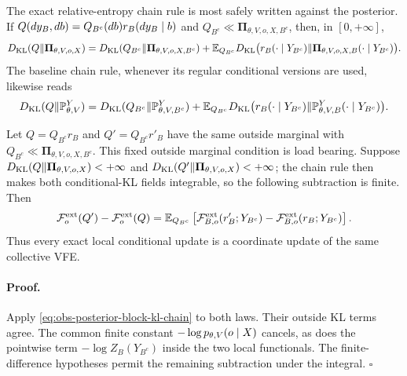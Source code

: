 The exact relative-entropy chain rule is most safely written against the
posterior.  If $Q(dy_B,db)=Q_{B^c}(db)r_B(dy_B\mid b)$ and
\(Q_{B^c}\ll\boldsymbol\Pi_{\theta,V,o,X,B^c}\), then, in \([0,+\infty]\),
\begin{equation}
D_{\mathrm{KL}}(Q\Vert\boldsymbol\Pi_{\theta,V,o,X})
=D_{\mathrm{KL}}(Q_{B^c}\Vert\boldsymbol\Pi_{\theta,V,o,X,B^c})
+\mathbb E_{Q_{B^c}}
D_{\mathrm{KL}}\bigl(r_B(\cdot\mid Y_{B^c})
\Vert\boldsymbol\Pi_{\theta,V,o,X,B}
(\cdot\mid Y_{B^c})\bigr).
\label{eq:obs-posterior-block-kl-chain}
\end{equation}
The baseline chain rule, whenever its regular conditional versions are used,
likewise reads
\begin{equation}
D_{\mathrm{KL}}(Q\Vert\mathbb P_{\theta,V}^{Y})
=D_{\mathrm{KL}}(Q_{B^c}\Vert\mathbb P_{\theta,V,B^c}^{Y})
+\mathbb E_{Q_{B^c}}
D_{\mathrm{KL}}\bigl(r_B(\cdot\mid Y_{B^c})
\Vert\mathbb P_{\theta,V,B}^{Y}
(\cdot\mid Y_{B^c})\bigr).
\label{eq:obs-block-kl-chain}
\end{equation}

Let $Q=Q_{B^c}r_B$ and $Q'=Q_{B^c}r'_B$ have the same outside marginal with
\(Q_{B^c}\ll\boldsymbol\Pi_{\theta,V,o,X,B^c}\). This fixed outside marginal condition is load bearing. Suppose
\(D_{\mathrm{KL}}(Q\Vert\boldsymbol\Pi_{\theta,V,o,X})<+\infty\) and
\(D_{\mathrm{KL}}(Q'\Vert\boldsymbol\Pi_{\theta,V,o,X})<+\infty\); the chain rule then makes both conditional-KL
fields integrable, so the following subtraction is finite.  Then
\begin{equation}
\mathcal F_o^{\rm ext}(Q')-\mathcal F_o^{\rm ext}(Q)
=\mathbb E_{Q_{B^c}}\left[
\mathcal F_{B,o}^{\rm ext}(r'_B;Y_{B^c})
-\mathcal F_{B,o}^{\rm ext}(r_B;Y_{B^c})
\right].
\label{eq:obs-local-global-potential}
\end{equation}
Thus every exact local conditional update is a coordinate update of the same
collective VFE.  

\paragraph{Proof.}
Apply \eqref{eq:obs-posterior-block-kl-chain} to both laws.  Their outside KL
terms agree. The common finite constant
\(-\log p_{\theta,V}(o\mid X)\) cancels, as does the
pointwise term $-\log Z_B(Y_{B^c})$ inside the two local functionals.  The
finite-difference hypotheses permit the remaining subtraction under the
integral.  $\square$

